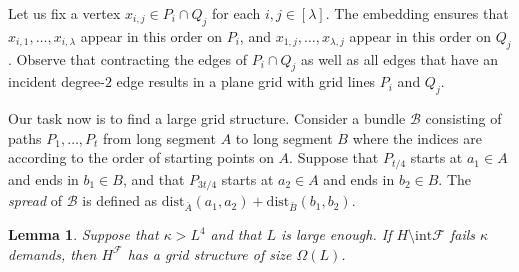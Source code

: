 \documentclass[a4paper,11pt]{article}
\newcommand{\inter}{\mathrm{int}}
\newcommand{\calB}{\mathcal{B}}
\newcommand{\calF}{\mathcal{F}}
\newcommand{\dist}{\mathrm{dist}}
\theoremstyle{plain}
\newtheorem{lemma}[theorem]{Lemma}
\newtheorem{identification rule}{Identification Rule}
\theoremstyle{definition}
\theoremstyle{remark}
\begin{document}
Let us fix a vertex $x_{i,j}\in P_i\cap Q_j$ for each $i,j\in [\lambda]$. The embedding ensures that $x_{i,1},\dots,x_{i,\lambda}$ appear in this order on $P_i$, and $x_{1,j},\dots,x_{\lambda,j}$ appear in this order on $Q_j$. Observe that contracting the edges of $P_i\cap Q_j$ as well as all edges that have an incident degree-$2$ edge results in a plane grid with grid lines $P_i$ and $Q_j$.

Our task now is to find a large grid structure. Consider a bundle $\calB$ consisting of paths $P_1,\dots,P_t$ from long segment $A$ to long segment $B$ where the indices are according to the order of starting points on $A$. Suppose that $P_{t/4}$ starts at $a_1\in A$ and ends in $b_1\in B$, and that $P_{3t/4}$ starts at $a_2\in A$ and ends in $b_2\in B$. The \emph{spread} of $\calB$ is defined as $\dist_{\bar A}(a_1,a_2)+\dist_{\bar B}(b_1,b_2)$.

\begin{lemma}\label{lem:findgrid}
Suppose that $\kappa>L^4$ and that $L$ is large enough. If $H\setminus \inter \calF$ fails $\kappa$ demands, then $H^\calF$ has a grid structure of size $\Omega(L)$.
\end{lemma}
\end{document}
